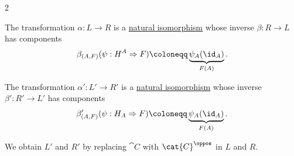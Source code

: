 \begin{lemma}
\begin{thmenum}
    \begin{paracol}{2}
      \begin{leftcolumn}
        \ParacolAlignmentHack
        The transformation \( \alpha: L \to R \) is a \hyperref[def:natural_isomorphism]{natural isomorphism} whose inverse \( {\beta: R \to L} \) has components
        \begin{equation*}
          \beta_{(A, F)}(\psi: H^A \Rightarrow F) \coloneqq \underbrace{\psi_A(\id_A)}_{F(A)}.
        \end{equation*}
      \end{leftcolumn}

      \begin{rightcolumn}
        \ParacolAlignmentHack
        The transformation \( \alpha': L' \to R' \) is a \hyperref[def:natural_isomorphism]{natural isomorphism} whose inverse \( {\beta': R' \to L'} \) has components
        \begin{equation*}
          \beta'_{(A, F)}(\psi: H_A \Rightarrow F) \coloneqq \underbrace{\psi_A(\id_A)}_{F(A)}.
        \end{equation*}
      \end{rightcolumn}
    \end{paracol}
  \end{thmenum}
\end{lemma}
\begin{comments}
  \item We obtain \( L' \) and \( R' \) by replacing \( \cat{C} \) with \( \cat{C}^\oppos \) in \( L \) and \( R \).
\end{comments}
